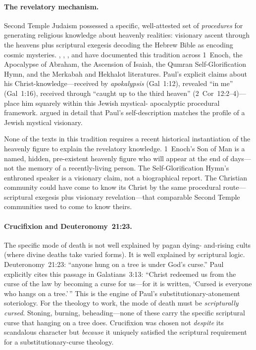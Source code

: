 \documentclass[12pt,oneside]{article}
\newcommand{\grk}[1]{\textit{#1}}
\begin{document}
\paragraph{The revelatory mechanism.}
Second Temple Judaism possessed a specific, well-attested set of
\textit{procedures} for generating religious knowledge about
heavenly realities: visionary ascent through the heavens plus
scriptural exegesis decoding the Hebrew Bible as encoding
cosmic mysteries.  \citet{Scholem1941}, \citet{Gruenwald1980},
\citet{Rowland1982}, and \citet{SchaferP2009} have documented this
tradition across 1~Enoch, the Apocalypse of Abraham, the Ascension
of Isaiah, the Qumran Self-Glorification Hymn, and the Merkabah
and Hekhalot literatures.  Paul's explicit claims about his
Christ-knowledge---received by \grk{apokalypsis} (Gal~1:12),
revealed \enquote{in me} (Gal~1:16), received through
\enquote{caught up to the third heaven}
(2~Cor~12:2--4)---place him squarely within this Jewish mystical-
apocalyptic procedural framework.  \citet{Segal1990} argued in
detail that Paul's self-description matches the profile of a
Jewish mystical visionary.

None of the texts in this tradition requires a recent historical
instantiation of the heavenly figure to explain the revelatory
knowledge.  1~Enoch's Son of Man is a named, hidden, pre-existent
heavenly figure who will appear at the end of days---not the memory
of a recently-living person.  The Self-Glorification Hymn's
enthroned speaker is a visionary claim, not a biographical report.
The Christian community could have come to know its Christ by the
same procedural route---scriptural exegesis plus visionary
revelation---that comparable Second Temple communities used to
come to know theirs.

\paragraph{Crucifixion and Deuteronomy~21:23.}
The specific mode of death is not well explained by pagan dying-
and-rising cults (where divine deaths take varied forms).  It is
well explained by scriptural logic.  Deuteronomy~21:23:
\enquote{anyone hung on a tree is under God's curse.}  Paul
explicitly cites this passage in Galatians~3:13: \enquote{Christ
redeemed us from the curse of the law by becoming a curse for
us---for it is written, `Cursed is everyone who hangs on a
tree.'\,}  This is the engine of Paul's substitutionary-atonement
soteriology.  For the theology to work, the mode of death must be
\textit{scripturally cursed}.  Stoning, burning, beheading---none
of these carry the specific scriptural curse that hanging on a
tree does.  Crucifixion was chosen not \textit{despite} its
scandalous character but \textit{because} it uniquely satisfied
the scriptural requirement for a substitutionary-curse theology.
\end{document}
